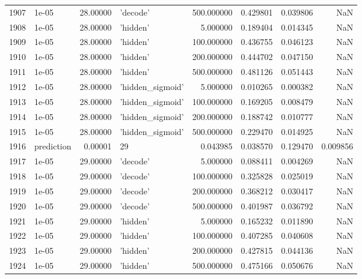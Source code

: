 \documentclass[10pt,a4paper]{article}
\begin{document}
\begin{tabular}{llrlrrrr}
1907 &       1e-05 &  28.00000 &           'decode' &  500.000000 &  0.429801 &  0.039806 &       NaN \\
1908 &       1e-05 &  28.00000 &           'hidden' &    5.000000 &  0.189404 &  0.014345 &       NaN \\
1909 &       1e-05 &  28.00000 &           'hidden' &  100.000000 &  0.436755 &  0.046123 &       NaN \\
1910 &       1e-05 &  28.00000 &           'hidden' &  200.000000 &  0.444702 &  0.047150 &       NaN \\
1911 &       1e-05 &  28.00000 &           'hidden' &  500.000000 &  0.481126 &  0.051443 &       NaN \\
1912 &       1e-05 &  28.00000 &   'hidden\_sigmoid' &    5.000000 &  0.010265 &  0.000382 &       NaN \\
1913 &       1e-05 &  28.00000 &   'hidden\_sigmoid' &  100.000000 &  0.169205 &  0.008479 &       NaN \\
1914 &       1e-05 &  28.00000 &   'hidden\_sigmoid' &  200.000000 &  0.188742 &  0.010777 &       NaN \\
1915 &       1e-05 &  28.00000 &   'hidden\_sigmoid' &  500.000000 &  0.229470 &  0.014925 &       NaN \\
1916 &  prediction &   0.00001 &                 29 &    0.043985 &  0.038570 &  0.129470 &  0.009856 \\
1917 &       1e-05 &  29.00000 &           'decode' &    5.000000 &  0.088411 &  0.004269 &       NaN \\
1918 &       1e-05 &  29.00000 &           'decode' &  100.000000 &  0.325828 &  0.025019 &       NaN \\
1919 &       1e-05 &  29.00000 &           'decode' &  200.000000 &  0.368212 &  0.030417 &       NaN \\
1920 &       1e-05 &  29.00000 &           'decode' &  500.000000 &  0.401987 &  0.036792 &       NaN \\
1921 &       1e-05 &  29.00000 &           'hidden' &    5.000000 &  0.165232 &  0.011890 &       NaN \\
1922 &       1e-05 &  29.00000 &           'hidden' &  100.000000 &  0.407285 &  0.040608 &       NaN \\
1923 &       1e-05 &  29.00000 &           'hidden' &  200.000000 &  0.427815 &  0.044136 &       NaN \\
1924 &       1e-05 &  29.00000 &           'hidden' &  500.000000 &  0.475166 &  0.050676 &       NaN \\

\end{tabular}
\end{document}
